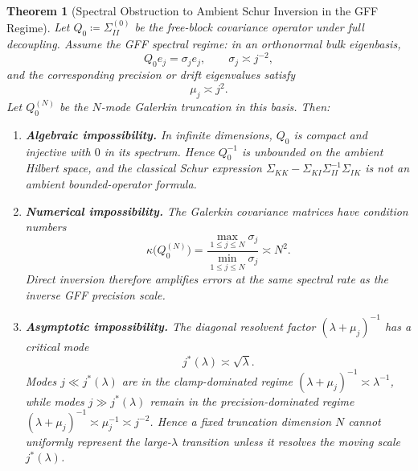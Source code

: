 \documentclass[preprint,12pt]{elsarticle}
\theoremstyle{plain}
\newtheorem{theorem}{Theorem}
\theoremstyle{definition}
\theoremstyle{remark}
\begin{document}
\begin{theorem}[Spectral Obstruction to Ambient Schur Inversion in the GFF Regime]
        \label{thm:triple_impossibility}
        Let $Q_0\coloneqq\Sigma_{II}^{(0)}$ be the free-block covariance operator
        under full decoupling.  Assume the GFF spectral regime: in an orthonormal
        bulk eigenbasis,
        \begin{equation}
            Q_0 e_j=\sigma_j e_j,
            \qquad
            \sigma_j\asymp j^{-2},
        \end{equation}
        and the corresponding precision or drift eigenvalues satisfy
        \begin{equation}
            \mu_j\asymp j^2.
        \end{equation}
        Let $Q_0^{(N)}$ be the $N$-mode Galerkin truncation in this basis.  Then:
        \begin{enumerate}[label=(\roman*)]
            \item \label{item:algebraic_impossibility}
            \textbf{Algebraic impossibility.}
            In infinite dimensions, $Q_0$ is compact and injective with
            $0$ in its spectrum.  Hence $Q_0^{-1}$ is unbounded on the ambient
            Hilbert space, and the classical Schur expression
            $\Sigma_{KK}-\Sigma_{KI}\Sigma_{II}^{-1}\Sigma_{IK}$ is not an
            ambient bounded-operator formula.

            \item \label{item:numerical_impossibility}
            \textbf{Numerical impossibility.}
            The Galerkin covariance matrices have condition numbers
            \begin{equation}
                \label{eq:spectral_ill_conditioning}
                \kappa\bigl(Q_0^{(N)}\bigr)
                =
                \frac{\max_{1\le j\le N}\sigma_j}{\min_{1\le j\le N}\sigma_j}
                \asymp N^{2}.
            \end{equation}
            Direct inversion therefore amplifies errors at the same spectral rate
            as the inverse GFF precision scale.

            \item \label{item:asymptotic_impossibility}
            \textbf{Asymptotic impossibility.}
            The diagonal resolvent factor $(\lambda+\mu_j)^{-1}$ has a critical
            mode
            \begin{equation}
                \label{eq:gff_critical_mode}
                j^*(\lambda)\asymp \sqrt{\lambda}.
            \end{equation}
            Modes $j\ll j^*(\lambda)$ are in the clamp-dominated regime
            $(\lambda+\mu_j)^{-1}\asymp\lambda^{-1}$, while modes
            $j\gg j^*(\lambda)$ remain in the precision-dominated regime
            $(\lambda+\mu_j)^{-1}\asymp\mu_j^{-1}\asymp j^{-2}$.  Hence a fixed
            truncation dimension $N$ cannot uniformly represent the large-$\lambda$
            transition unless it resolves the moving scale $j^*(\lambda)$.
        \end{enumerate}


\end{theorem}
\end{document}
